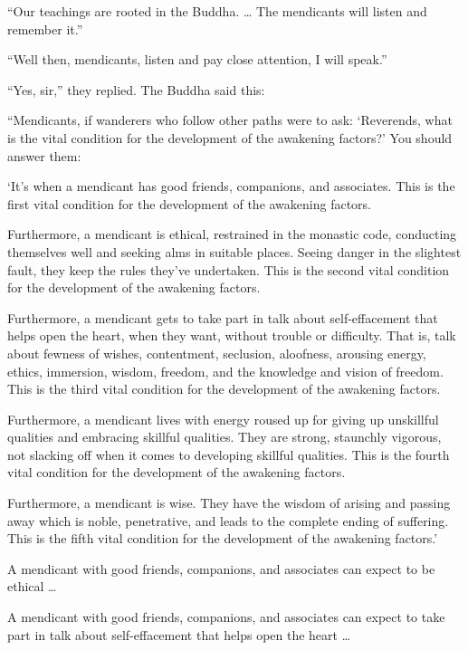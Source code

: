 \documentclass[12pt,openany]{book}%
\begin{document}
“Our teachings are rooted in the Buddha. … The mendicants will listen and remember it.” 

“Well then, mendicants, listen and pay close attention, I will speak.” 

“Yes, sir,” they replied. The Buddha said this: 

“Mendicants, if wanderers who follow other paths were to ask: ‘Reverends, what is the vital condition for the development of the awakening factors?’ You should answer them: 

‘It’s when a mendicant has good friends, companions, and associates. This is the first vital condition for the development of the awakening factors. 

Furthermore, a mendicant is ethical, restrained in the monastic code, conducting themselves well and seeking alms in suitable places. Seeing danger in the slightest fault, they keep the rules they’ve undertaken. This is the second vital condition for the development of the awakening factors. 

Furthermore, a mendicant gets to take part in talk about self-effacement that helps open the heart, when they want, without trouble or difficulty. That is, talk about fewness of wishes, contentment, seclusion, aloofness, arousing energy, ethics, immersion, wisdom, freedom, and the knowledge and vision of freedom. This is the third vital condition for the development of the awakening factors. 

Furthermore, a mendicant lives with energy roused up for giving up unskillful qualities and embracing skillful qualities. They are strong, staunchly vigorous, not slacking off when it comes to developing skillful qualities. This is the fourth vital condition for the development of the awakening factors. 

Furthermore, a mendicant is wise. They have the wisdom of arising and passing away which is noble, penetrative, and leads to the complete ending of suffering. This is the fifth vital condition for the development of the awakening factors.’ 

A mendicant with good friends, companions, and associates can expect to be ethical … 

A mendicant with good friends, companions, and associates can expect to take part in talk about self-effacement that helps open the heart … 
\end{document}
